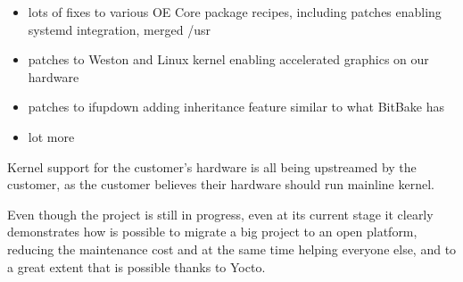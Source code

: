 \documentclass[10pt, a5paper]{article}
\begin{document}
\begin{itemize}
  \item lots of fixes to various OE Core package recipes, including patches enabling systemd integration, merged /usr
  \item patches to Weston and Linux kernel enabling accelerated graphics on our hardware
  \item patches to ifupdown adding inheritance feature similar to what BitBake has
  \item lot more
\end{itemize}

Kernel support for the customer's hardware is all being upstreamed by the customer, as the customer believes their hardware should run mainline kernel.

Even though the project is still in progress, even at its current stage it clearly demonstrates how is possible to migrate a big project to an open platform, reducing the maintenance cost and at the same time helping everyone else, and to a great extent that is possible thanks to Yocto.
\end{document}
